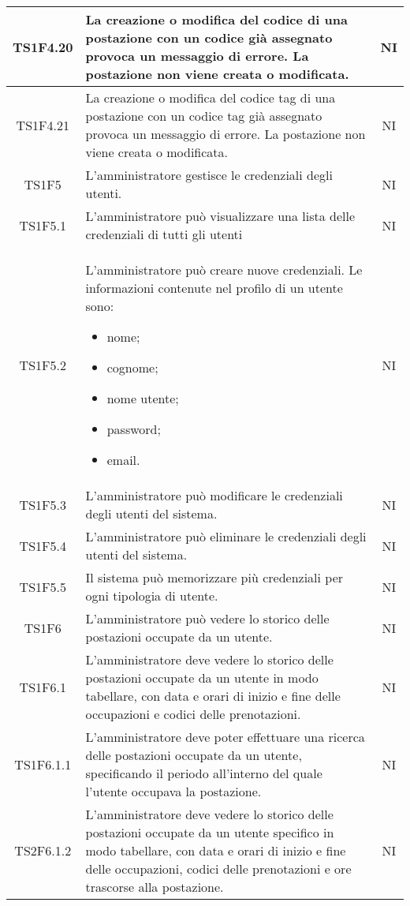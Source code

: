 \begin{center}
\begin{longtable}{|c|p{10cm}|c|}
			\hline	
			TS1F4.20 & La creazione o modifica del codice di una postazione con un codice già assegnato provoca un messaggio di errore. La postazione non viene creata o modificata. & NI \\	
			\hline	
			TS1F4.21 & La creazione o modifica del codice tag di una postazione con un codice tag già assegnato provoca un messaggio di errore. La postazione non viene creata o modificata. & NI \\	
			\hline	
			TS1F5 & L'amministratore gestisce le credenziali degli utenti. & NI \\	
			\hline
			TS1F5.1 & L'amministratore può visualizzare una lista delle credenziali di tutti gli utenti & NI \\	
			\hline
			TS1F5.2 & L'amministratore può creare nuove credenziali. Le informazioni contenute nel profilo di un utente sono:
			\begin{itemize}
				\item nome;
				\item cognome;
				\item nome utente;
				\item password;
				\item email.
			\end{itemize} & NI \\	
			\hline
			TS1F5.3 & L’amministratore può modificare le credenziali degli utenti del sistema. & NI \\	
			\hline
			TS1F5.4 & L’amministratore può eliminare le credenziali degli utenti del sistema. & NI \\	
			\hline
			TS1F5.5 & Il sistema può memorizzare più credenziali per ogni tipologia di utente. & NI \\	
			\hline
			TS1F6 & L'amministratore può vedere lo storico delle postazioni occupate da un utente. & NI \\	
			\hline
			TS1F6.1 & L'amministratore deve vedere lo storico delle postazioni occupate da un utente in modo tabellare, con data e orari di inizio e fine delle occupazioni e codici delle prenotazioni. & NI \\	
			\hline
			TS1F6.1.1 & L'amministratore deve poter effettuare una ricerca delle postazioni occupate da un utente, specificando il periodo all'interno del quale l'utente occupava la postazione. & NI \\	
			\hline
			TS2F6.1.2 & L'amministratore deve vedere lo storico delle postazioni occupate da un utente specifico in modo tabellare, con data e orari di inizio e fine delle occupazioni, codici delle prenotazioni e ore trascorse alla postazione. & NI \\	

\end{longtable}
\end{center}
